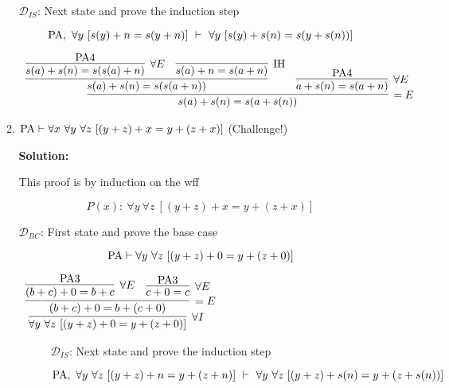 \documentclass[11pt]{report}
\begin{document}
\begin{enumerate}
\begin{enumerate}
		$\mathcal{D}_{IS}$: Next state and prove the induction step

		$$ \PA, \ \forall y \ [s(y) + n = s(y+n)] \ \vdash \ \forall y \ [s(y) + s(n) = s(y+s(n))]$$

		\begin{mdframed}
			\begin{center}
				\footnotesize{$\begin{array}{c}
					\infer[=E]{s(a)+s(n) = s(a + s(n))}
						{\infer[]{s(a)+s(n)=s(s(a+n))}
							{\infer[\forall E]{s(a)+s(n)=s(s(a)+n)}{\PA 4}
							&
							\infer[\IH]{s(a) + n = s(a+n)}{}}
						&
						\infer[\forall E]{a + s(n) = s(a + n)}{\PA 4}}
				\end{array}$}
			\end{center}
		\end{mdframed}

		
		\newpage
		\item $\PA \vdash \forall x \ \forall y \ \forall z \ [(y + z) + x = y + (z + x)]$ \hspace{3.5cm} (Challenge!)

		{\bf Solution:} 

		This proof is by induction on the wff 

		$$ P(x) : \ \forall y \ \forall z \ [(y + z) + x = y + (z + x)]$$

		$\mathcal{D}_{BC}$: First state and prove the base case 

		$$ \text{PA} \vdash \forall y \ \forall z \ [(y + z) + 0 = y + (z + 0)]$$

		\begin{mdframed}
			\begin{center}
				$\begin{array}{c}
					\infer[\forall I]{\forall y \ \forall z \ [(y + z) + 0 = y + (z + 0)]}
						{\infer[=E]{(b + c) + 0 = b + (c + 0)}
							{\infer[\forall E]{(b+c)+0 = b+c}
								{\PA 3}
							&
							\infer[\forall E]{c + 0 = c}
								{\PA 3}}}
				\end{array}$
			\end{center}
		\end{mdframed}

		\begin{sidewaysfigure}
		$\mathcal{D}_{IS}$: Next state and prove the induction step

		$$ \text{PA}, \ \forall y \ \forall z \ [(y + z) + n = y + (z + n)] \ \vdash \ \forall y \ \forall z \ [(y + z) + s(n) = y + (z + s(n))] $$
		
		

\end{sidewaysfigure}
\end{enumerate}
\end{enumerate}
\end{document}
